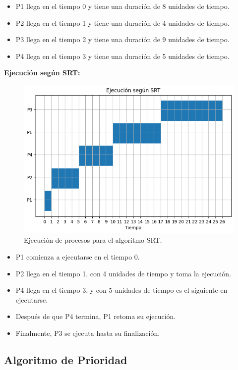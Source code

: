 \begin{itemize} 
	\item P1 llega en el tiempo 0 y tiene una duración de 8 unidades de tiempo. 
	\item P2 llega en el tiempo 1 y tiene una duración de 4 unidades de tiempo. 
	\item P3 llega en el tiempo 2 y tiene una duración de 9 unidades de tiempo. 
	\item P4 llega en el tiempo 3 y tiene una duración de 5 unidades de tiempo.
\end{itemize}

\textbf{Ejecución según SRT:}

\begin{figure}[H] \centering \includegraphics[width=0.8\linewidth]{Imagenes/srt_ejecucion.png}
	 \caption{Ejecución de procesos para el algoritmo SRT.} 
\end{figure}

\begin{itemize} 
	\item P1 comienza a ejecutarse en el tiempo 0. 
	\item P2 llega en el tiempo 1, con 4 unidades de tiempo y toma la ejecución. 
	\item P4 llega en el tiempo 3, y con 5 unidades de tiempo es el siguiente en ejecutarse. 
	\item Después de que P4 termina, P1 retoma su ejecución. 
	\item Finalmente, P3 se ejecuta hasta su finalización. 
\end{itemize}

\subsection{Algoritmo de Prioridad}

